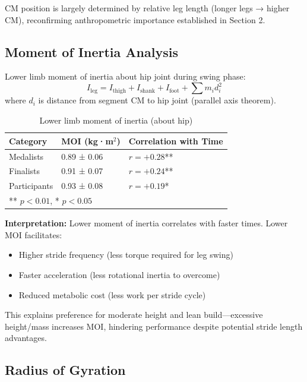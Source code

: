 CM position is largely determined by relative leg length (longer legs → higher CM), reconfirming anthropometric importance established in Section 2.

\subsection{Moment of Inertia Analysis}

Lower limb moment of inertia about hip joint during swing phase:
\begin{equation}
I_{\text{leg}} = I_{\text{thigh}} + I_{\text{shank}} + I_{\text{foot}} + \sum m_i d_i^2
\end{equation}
where $d_i$ is distance from segment CM to hip joint (parallel axis theorem).

\begin{table}[H]
\centering
\caption{Lower limb moment of inertia (about hip)}
\begin{tabular}{@{}lll@{}}
\toprule
\textbf{Category} & \textbf{MOI (kg·m$^2$)} & \textbf{Correlation with Time} \\
\midrule
Medalists & 0.89 ± 0.06 & $r = +0.28$** \\
Finalists & 0.91 ± 0.07 & $r = +0.24$** \\
Participants & 0.93 ± 0.08 & $r = +0.19$* \\
\bottomrule
\multicolumn{3}{l}{\small{** $p < 0.01$, * $p < 0.05$}}
\end{tabular}
\end{table}

\textbf{Interpretation:} Lower moment of inertia correlates with faster times. Lower MOI facilitates:
\begin{itemize}
    \item Higher stride frequency (less torque required for leg swing)
    \item Faster acceleration (less rotational inertia to overcome)
    \item Reduced metabolic cost (less work per stride cycle)
\end{itemize}

This explains preference for moderate height and lean build—excessive height/mass increases MOI, hindering performance despite potential stride length advantages.

\subsection{Radius of Gyration}

